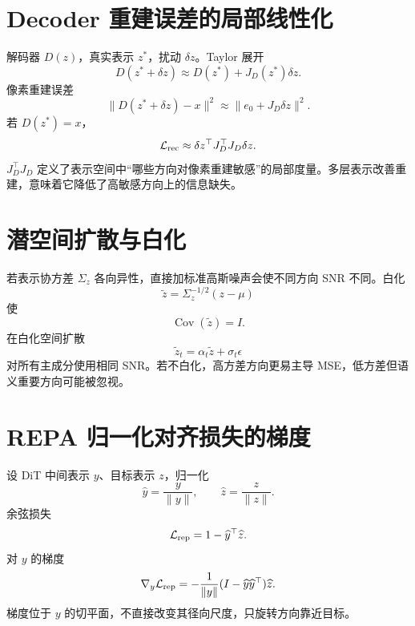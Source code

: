 \documentclass[UTF8,12pt,a4paper,fontset=none]{ctexart}
\numberwithin{equation}{section}
\newcommand{\Loss}{\mathcal{L}}
\begin{document}
\section{Decoder 重建误差的局部线性化}
解码器 $D(z)$，真实表示 $z^*$，扰动 $\delta z$。Taylor 展开
\begin{equation}
 D(z^*+\delta z)
 \approx D(z^*)+J_D(z^*)\delta z.
\end{equation}
像素重建误差
\begin{equation}
 \|D(z^*+\delta z)-x\|^2
 \approx\|e_0+J_D\delta z\|^2.
\end{equation}
若 $D(z^*)=x$，
\begin{equation}
 \Loss_{\rm rec}\approx
 \delta z^\top J_D^\top J_D\delta z.
\end{equation}
$J_D^\top J_D$ 定义了表示空间中“哪些方向对像素重建敏感”的局部度量。多层表示改善重建，意味着它降低了高敏感方向上的信息缺失。

\section{潜空间扩散与白化}
若表示协方差 $\Sigma_z$ 各向异性，直接加标准高斯噪声会使不同方向 SNR 不同。白化
\begin{equation}
 \widetilde z=\Sigma_z^{-1/2}(z-\mu)
\end{equation}
使
\begin{equation}
 \operatorname{Cov}(\widetilde z)=I.
\end{equation}
在白化空间扩散
\begin{equation}
 \widetilde z_t=\alpha_t\widetilde z+
 \sigma_t\epsilon
\end{equation}
对所有主成分使用相同 SNR。若不白化，高方差方向更易主导 MSE，低方差但语义重要方向可能被忽视。

\section{REPA 归一化对齐损失的梯度}
设 DiT 中间表示 $y$、目标表示 $z$，归一化
\begin{equation}
 \widehat y=\frac y{\|y\|},
 \qquad \widehat z=\frac z{\|z\|}.
\end{equation}
余弦损失
\begin{equation}
 \Loss_{\rm rep}=1-\widehat y^\top\widehat z.
\end{equation}
对 $y$ 的梯度
\begin{equation}
 \nabla_y\Loss_{\rm rep}
 =-\frac1{\|y\|}
 (I-\widehat y\widehat y^\top)\widehat z.
\end{equation}
梯度位于 $y$ 的切平面，不直接改变其径向尺度，只旋转方向靠近目标。
\end{document}
